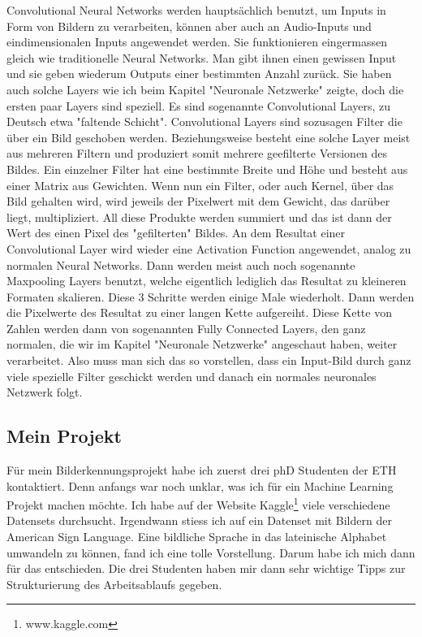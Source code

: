 \documentclass[10pt,a4paper,ngerman,english]{article}
\begin{document}
Convolutional Neural Networks werden hauptsächlich benutzt, um Inputs in Form von Bildern zu verarbeiten, können aber auch an Audio-Inputs und eindimensionalen Inputs angewendet werden. Sie funktionieren eingermassen gleich wie traditionelle Neural Networks. Man gibt ihnen einen gewissen Input und sie geben wiederum Outputs einer bestimmten Anzahl zurück. Sie haben auch solche Layers wie ich beim Kapitel "Neuronale Netzwerke" zeigte, doch die ersten paar Layers sind speziell. Es sind sogenannte Convolutional Layers, zu Deutsch etwa "faltende Schicht". Convolutional Layers sind sozusagen Filter die über ein Bild geschoben werden. Beziehungsweise besteht eine solche Layer meist aus mehreren Filtern und produziert somit mehrere geefilterte Versionen des Bildes. Ein einzelner Filter hat eine bestimmte Breite und Höhe und besteht aus einer Matrix aus Gewichten. Wenn nun ein Filter, oder auch Kernel, über das Bild gehalten wird, wird jeweils der Pixelwert mit dem Gewicht, das darüber liegt, multipliziert. All diese Produkte werden summiert und das ist dann der Wert des einen Pixel des "gefilterten" Bildes. An dem Resultat einer Convolutional Layer wird wieder eine Activation Function angewendet, analog zu normalen Neural Networks. Dann werden meist auch noch sogenannte Maxpooling Layers benutzt, welche eigentlich lediglich das Resultat zu kleineren Formaten skalieren. Diese 3 Schritte werden einige Male wiederholt. Dann werden die Pixelwerte des Resultat zu einer langen Kette aufgereiht. Diese Kette von Zahlen werden dann von sogenannten Fully Connected Layers, den ganz normalen, die wir im Kapitel "Neuronale Netzwerke" angeschaut haben, weiter verarbeitet. Also muss man sich das so vorstellen, dass ein Input-Bild durch ganz viele spezielle Filter geschickt werden und danach ein normales neuronales Netzwerk folgt.

\subsection{Mein Projekt}

Für mein Bilderkennungsprojekt habe ich zuerst drei phD Studenten der ETH kontaktiert. Denn anfangs war noch unklar, was ich für ein Machine Learning Projekt machen möchte. Ich habe auf der Website Kaggle\footnote{www.kaggle.com} viele verschiedene Datensets durchsucht. Irgendwann stiess ich auf ein Datenset mit Bildern der American Sign Language. Eine bildliche Sprache in das lateinische Alphabet umwandeln zu können, fand ich eine tolle Vorstellung. Darum habe ich mich dann für das entschieden. Die drei Studenten haben mir dann sehr wichtige Tipps zur Strukturierung des Arbeitsablaufs gegeben. 
\end{document}
